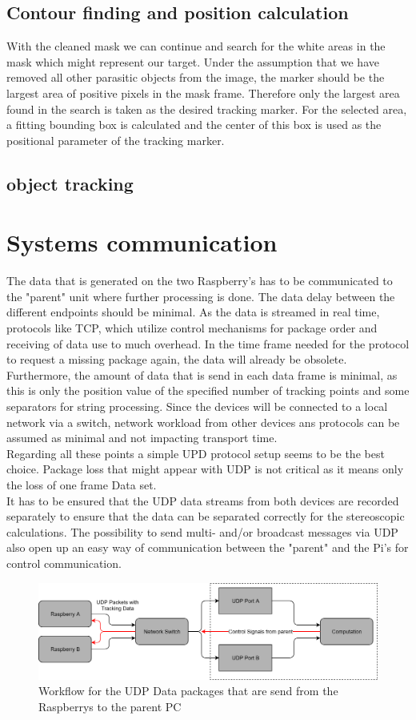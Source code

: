 \subsection{Contour finding and position calculation}
With the cleaned mask we can continue and search for the white areas in the mask which might represent our target. Under the assumption that we have removed all other parasitic objects from the image, the marker should be the largest area of positive pixels in the mask frame. Therefore only the largest area found in the search is taken as the desired tracking marker. For the selected area, a fitting bounding box is calculated and the center of this box is used as the positional parameter of the tracking marker.
\subsection{object tracking}
\section{Systems communication}
The data that is generated on the two Raspberry's has to be communicated to the "parent" unit where further processing is done. The data delay between the different endpoints should be minimal. As the data is streamed in real time, protocols like TCP, which utilize control mechanisms for package order and receiving of data use to much overhead. In the time frame needed for the protocol to request a missing package again, the data will already be obsolete. \\Furthermore, the amount of data that is send in each data frame is minimal, as this is only the position value of the specified number of tracking points and some separators for string processing. Since the devices will be connected to a local network via a switch, network workload from other devices ans protocols can be assumed as minimal and not impacting transport time.\\
Regarding all these points a simple UPD protocol setup seems to be the best choice. Package loss that might appear with UDP is not critical as it means only the loss of one frame Data set.\\
It has to be ensured that the UDP data streams from both devices are recorded separately to ensure that the data can be separated correctly for the stereoscopic calculations.
The possibility to send multi- and/or broadcast messages via UDP also open up an easy way of communication between the "parent" and the Pi's for control communication.
\begin{figure}[H]
\includegraphics[width=\textwidth]{images/Network_Diagram.png}
\caption{Workflow for the UDP Data packages that are send from the Raspberrys to the parent PC}
\label{img:netzwerk_diagram} 
\end{figure}
\newpage
